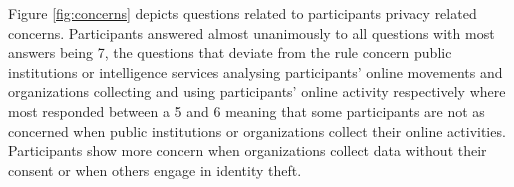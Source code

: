 



Figure \ref{fig:concerns} depicts questions related to participants
privacy related concerns. Participants answered almost unanimously to
all questions with most answers being 7, the questions that deviate
from the rule concern public institutions or intelligence services analysing
participants' online movements and organizations collecting and using
participants' online activity respectively where most responded between
a 5 and 6 meaning that some participants are not as concerned when
public institutions or organizations collect their online activities.
Participants show more concern when organizations collect data without
their consent or when others engage in identity theft.

